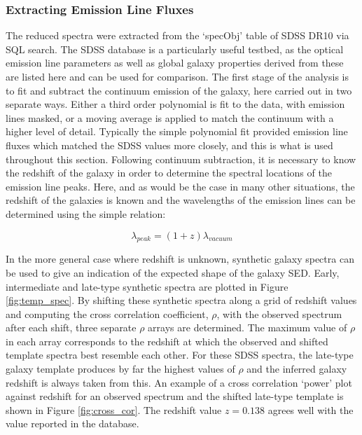 \documentclass{literature}
\begin{document}
\subsubsection{Extracting Emission Line Fluxes}\label{subsub:ex_em}   
The reduced spectra were extracted from the `specObj' table of SDSS DR10 via SQL search. The SDSS database is a particularly useful testbed, as the optical emission line parameters as well as global galaxy properties derived from these are listed here and can be used for comparison.  The first stage of the analysis is to fit and subtract the continuum emission of the galaxy, here carried out in two separate ways. Either a third order polynomial is fit to the data, with emission lines masked, or a moving average is applied to match the continuum with a higher level of detail. Typically the simple polynomial fit provided emission line fluxes which matched the SDSS values more closely, and this is what is used throughout this section. Following continuum subtraction, it is necessary to know the redshift of the galaxy in order to determine the spectral locations of the emission line peaks. Here, and as would be the case in many other situations, the redshift of the galaxies is known and the wavelengths of the emission lines can be determined using the simple relation: 

\begin{equation}
\label{eq:redshift}
	\lambda _{peak} = (1 + z)\lambda _{vacuum}
\end{equation}

In the more general case where redshift is unknown, synthetic galaxy spectra can be used to give an indication of the expected shape of the galaxy SED. Early, intermediate and late-type synthetic spectra are plotted in Figure \ref{fig:temp_spec}. By shifting these synthetic spectra along a grid of redshift values and computing the cross correlation coefficient, $\rho$, with the observed spectrum after each shift, three separate $\rho$ arrays are determined. The maximum value of $\rho$ in each array corresponds to the redshift at which the observed and shifted template spectra best resemble each other. For these SDSS spectra, the late-type galaxy template produces by far the highest values of $\rho$ and the inferred galaxy redshift is always taken from this. An example of a cross correlation `power' plot against redshift for an observed spectrum and the shifted late-type template is shown in Figure \ref{fig:cross_cor}. The redshift value $z = 0.138$ agrees well with the value reported in the database.    \\ 
\end{document}
